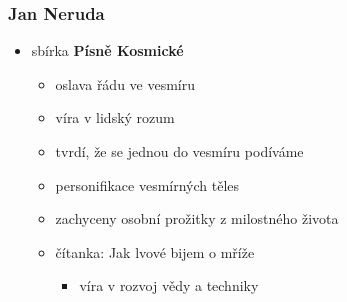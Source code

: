 \subsubsection{Jan Neruda}
\begin{itemize}
\item sbírka \textbf{Písně Kosmické}
	\begin{itemize}
	\item oslava řádu ve vesmíru
	\item víra v lidský rozum
	\item tvrdí, že se jednou do vesmíru podíváme
	\item personifikace vesmírných těles
	\item zachyceny osobní prožitky z milostného života
	\item čítanka: Jak lvové bijem o mříže
		\begin{itemize}
		\item víra v rozvoj vědy a techniky
		\end{itemize}
		

\end{itemize}
\end{itemize}

